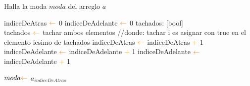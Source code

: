 \begin{algorithm}
\caption{Halla la moda $moda$ del arreglo $a$}
\begin{algorithmic}[1]
\STATE indiceDeAtras $\textcolor{orange}{\leftarrow}$ 0
\STATE indiceDeAdelante $\textcolor{orange}{\leftarrow}$ 0
\STATE tachados: [bool] \\

        \STATE tachados $\textcolor{orange}{\leftarrow}$ tachar ambos elementos //donde: tachar i es asignar con true en el elemento iesimo de tachados
            \STATE indiceDeAtras $\textcolor{orange}{\leftarrow}$ indiceDeAtras \textcolor{orange}{+} 1
        \ENDWHILE
            \STATE indiceDeAdelante $\textcolor{orange}{\leftarrow}$ indiceDeAdelante \textcolor{orange}{+} 1
        \ENDWHILE
    \ELSE
        \STATE indiceDeAdelante $\textcolor{orange}{\leftarrow}$ indiceDeAdelante \textcolor{orange}{+} 1
    \ENDIF

\ENDWHILE
\STATE $moda \textcolor{orange}{\leftarrow}$ $a_{indiceDeAtras}$
\end{algorithmic}
\end{algorithm}
